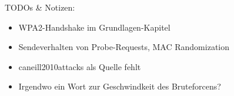 TODOs \& Notizen:
\begin{itemize}
	\item WPA2-Handshake im Grundlagen-Kapitel
	\item Sendeverhalten von Probe-Requests, MAC Randomization
	\item caneill2010attacks als Quelle fehlt
	\item Irgendwo ein Wort zur Geschwindkeit des Bruteforcens?
\end{itemize}
